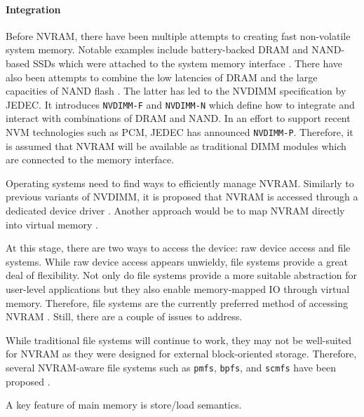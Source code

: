 \paragraph{Integration}

Before \ac{NVRAM}, there have been multiple attempts to creating fast
non-volatile system memory. Notable examples include battery-backed \ac{DRAM}
\cite{molina1992main, condit2009better, bailey2013exploring} and NAND-based
\acp{SSD} which were attached to the system memory interface \cite{wu1994envy,
shi2010write}. There have also been attempts to combine the low latencies of
\ac{DRAM} and the large capacities of NAND flash \cite{oe2016feasibility}. The
latter has led to the \ac{NVDIMM} specification by \ac{JEDEC}. It introduces
\texttt{NVDIMM-F} and \texttt{NVDIMM-N} which define how to integrate and
interact with combinations of \ac{DRAM} and NAND. In an effort to support recent
\ac{NVM} technologies such as \ac{PCM}, \ac{JEDEC} has announced
\texttt{NVDIMM-P}\cite{jedec2017nvdimm}. Therefore, it is assumed that
\ac{NVRAM} will be available as traditional DIMM modules which are connected to
the memory interface.

Operating systems need to find ways to efficiently manage \ac{NVRAM}. Similarly
to previous variants of \ac{NVDIMM}, it is proposed that \ac{NVRAM} is accessed
through a dedicated device driver \cite{intel2017nvdimm}. Another approach would
be to map \ac{NVRAM} directly into virtual memory .

At this stage, there are two ways to access the device: raw device access and
file systems. While raw device access appears unwieldy, file systems provide a
great deal of flexibility. Not only do file systems provide a more suitable
abstraction for user-level applications but they also enable memory-mapped IO
through virtual memory. Therefore, file systems are the currently preferred
method of accessing \ac{NVRAM} \cite{oukid2017data}. Still, there are a couple
of issues to address.

While traditional file systems will continue to work, they may not be
well-suited for \ac{NVRAM} as they were designed for external block-oriented
storage. Therefore, several \ac{NVRAM}-aware file systems such as \texttt{pmfs},
\texttt{bpfs}, and \texttt{scmfs} have been proposed \cite{dulloor2014system,
condit2009better, wu2011scmfs}. 

A key feature of main memory is store/load semantics.


